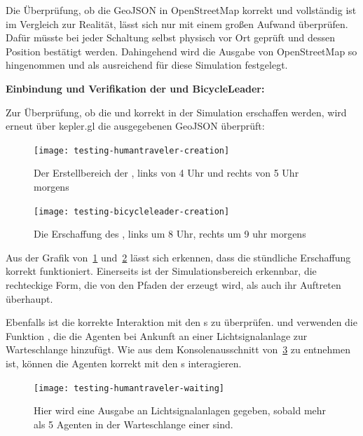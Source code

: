 Die Überprüfung, ob die GeoJSON in OpenStreetMap korrekt und vollständig ist im Vergleich zur Realität, lässt sich nur mit einem großen Aufwand überprüfen.
Dafür müsste bei jeder Schaltung selbst physisch vor Ort geprüft und dessen Position bestätigt werden.
Dahingehend wird die Ausgabe von OpenStreetMap so hingenommen und als ausreichend für diese Simulation festgelegt.

\textbf{Einbindung und Verifikation der  und {BicycleLeader}:}

Zur Überprüfung, ob die  und  korrekt in der Simulation erschaffen werden, wird erneut über kepler.gl die ausgegebenen GeoJSON überprüft:

\begin{figure}[h]
    \centering
    \texttt{[image: testing-humantraveler-creation]}~\caption{Der Erstellbereich der , links von 4 Uhr und rechts von 5 Uhr morgens}
    \label{fig:spawning-human-traveler}
\end{figure}

\begin{figure}[h]
    \centering
    \texttt{[image: testing-bicycleleader-creation]}~\caption{Die Erschaffung des , links um 8 Uhr, rechts um 9 uhr morgens}
    \label{fig:spawning-bicycle-leader}
\end{figure}

Aus der Grafik von~\ref{fig:spawning-human-traveler} und~\ref{fig:spawning-bicycle-leader} lässt sich erkennen, dass die stündliche Erschaffung korrekt funktioniert.
Einerseits ist der Simulationsbereich erkennbar, die rechteckige Form, die von den Pfaden der  erzeugt wird, als auch ihr Auftreten überhaupt.

Ebenfalls ist die korrekte Interaktion mit den s zu überprüfen.
 und  verwenden die Funktion , die die Agenten bei Ankunft an einer Lichtsignalanlage zur Warteschlange hinzufügt.
Wie aus dem Konsolenausschnitt von~\ref{fig:waiting-at-traffic-light-humantraveler} zu entnehmen ist, können die Agenten korrekt mit den s interagieren.

\begin{figure}[h]
    \centering
    \texttt{[image: testing-humantraveler-waiting]}~\caption{Hier wird eine Ausgabe an Lichtsignalanlagen gegeben, sobald mehr als 5 Agenten in der Warteschlange einer  sind.}
    \label{fig:waiting-at-traffic-light-humantraveler}
\end{figure}

